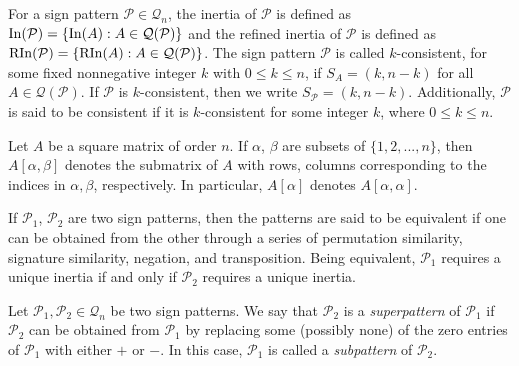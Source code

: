 \documentclass[a4paper, 10pt]{article}
\numberwithin{equation}{section}
\def\In{{\rm In}}
\def\RIn{{\rm RIn}}
\begin{document}
	
	
	For a sign pattern $\mathcal{P} \in \mathcal{Q}_n$, the inertia of $\mathcal{P}$ is defined as $\In(\mathcal{P})=\{\In(A): A\in \mathcal{Q}(\mathcal{P})\}$ and the refined
	inertia of $\mathcal{P}$ is defined as $\RIn(\mathcal{P})=\{\RIn(A): A\in \mathcal{Q}(\mathcal{P})\}$. The sign pattern $\mathcal{P}$ is called $k$-consistent, for some fixed nonnegative integer $k$ with $0\leq k \leq n$, if $S_A=(k,n-k)$ for all $A\in \mathcal{Q}(\mathcal{P})$. If $\mathcal{P}$ is $k$-consistent, then we write $S_{\mathcal{P}}=(k,n-k)$. Additionally, $\mathcal{P}$ is said to be consistent if it is $k$-consistent for some integer $k$, where $0\leq k\leq n$.
	
	Let $A$ be a square matrix of order $n$. If $\alpha$, $\beta$ are subsets of $\{1,2,...,n\}$, then $A[\alpha,\beta]$ denotes the submatrix of $A$ with rows, columns corresponding to the indices in $\alpha, \beta$, respectively. In particular, $A[\alpha]$ denotes $A[\alpha, \alpha]$.
	
	
	
	If $\mathcal{P}_1$, $\mathcal{P}_2$ are two sign patterns, then the patterns are said to be equivalent if one can be obtained from
	the other through a series of permutation similarity, signature similarity, negation, and transposition. Being
	equivalent, $\mathcal{P}_1$ requires a unique inertia if and only if $\mathcal{P}_2$ requires a unique inertia.
	
	Let $\mathcal{P}_1, \mathcal{P}_2 \in \mathcal{Q}_n$ be two sign patterns. We say that $\mathcal{P}_2$ is a \textit{superpattern} of $\mathcal{P}_1$ if $\mathcal{P}_2$ can be obtained from $\mathcal{P}_1$ by replacing some (possibly none) of the zero entries of $\mathcal{P}_1$ with either $+$ or $-$. In this case, $\mathcal{P}_1$ is called a \textit{subpattern} of $\mathcal{P}_2$.
	
	
	
\end{document}
